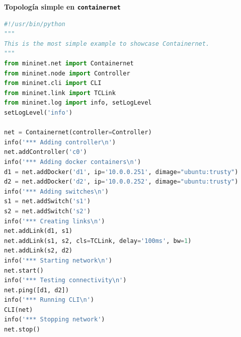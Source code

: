 \documentclass[a4paper, oneside, 12pt]{book}
\begin{document}
	\vspace{20px}
	\noindent \textbf{\large Topología simple en \texttt{containernet}}\\
		\begin{lstlisting}[language=Python, caption={Código topología simple en \texttt{containernet} (\texttt{containernet\_example.py})}, label={lst: topo simple containernet}]
#!/usr/bin/python
"""
This is the most simple example to showcase Containernet.
"""
from mininet.net import Containernet
from mininet.node import Controller
from mininet.cli import CLI
from mininet.link import TCLink
from mininet.log import info, setLogLevel
setLogLevel('info')
		
net = Containernet(controller=Controller)
info('*** Adding controller\n')
net.addController('c0')
info('*** Adding docker containers\n')
d1 = net.addDocker('d1', ip='10.0.0.251', dimage="ubuntu:trusty")
d2 = net.addDocker('d2', ip='10.0.0.252', dimage="ubuntu:trusty")
info('*** Adding switches\n')
s1 = net.addSwitch('s1')
s2 = net.addSwitch('s2')
info('*** Creating links\n')
net.addLink(d1, s1)
net.addLink(s1, s2, cls=TCLink, delay='100ms', bw=1)
net.addLink(s2, d2)
info('*** Starting network\n')
net.start()
info('*** Testing connectivity\n')
net.ping([d1, d2])
info('*** Running CLI\n')
CLI(net)
info('*** Stopping network')
net.stop()
	\end{lstlisting}
\end{document}
